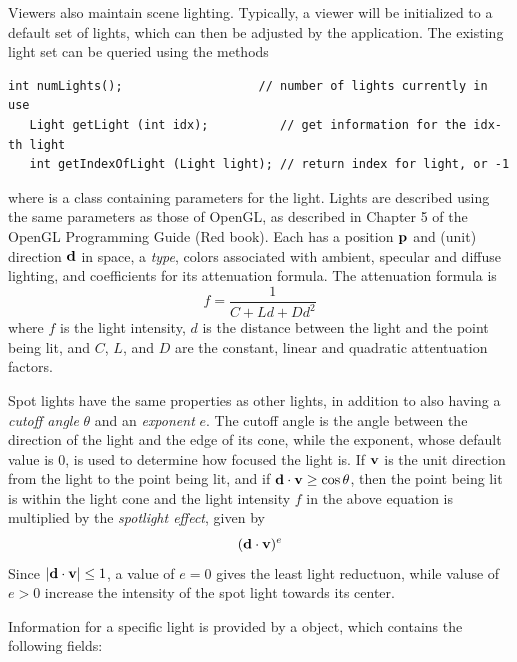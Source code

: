 Viewers also maintain scene lighting. Typically, a viewer will be
initialized to a default set of lights, which can then be
adjusted by the application. The existing
light set can be queried using the methods
%
\begin{lstlisting}[]
   int numLights();                   // number of lights currently in use
   Light getLight (int idx);          // get information for the idx-th light 
   int getIndexOfLight (Light light); // return index for light, or -1
\end{lstlisting}
%
where  is a class 
containing parameters for the light.
Lights are described using the same parameters as those of OpenGL,
as described in Chapter 5 of the OpenGL Programming Guide (Red book).
Each has a position ${\bf p}$ and (unit) direction $\bf d$ in space, a {\it
type}, colors associated with ambient, specular and diffuse lighting,
and coefficients for its attenuation formula. The attenuation formula
is
%
\begin{equation*}
f = \frac{1}{C + L d + D d^2}
\end{equation*}
%
where $f$ is the light intensity, $d$ is the distance between the
light and the point being lit, and $C$, $L$, and $D$ are the constant,
linear and quadratic attentuation factors. 

Spot lights have the same properties as other lights, in addition to
also having a {\it cutoff angle} $\theta$ and an {\it exponent} $e$.
The cutoff angle is the angle between the direction of the light and
the edge of its cone, while the exponent, whose default value is 0, is
used to determine how focused the light is. If $\bf{v}$ is the unit
direction from the light to the point being lit, and if $ {\bf d}
\cdot {\bf v} \ge \cos \theta $, then the point being lit is within
the light cone and the light intensity $f$ in the above equation is
multiplied by the {\it spotlight effect}, given by
%
\begin{equation*}
({\bf d} \cdot {\bf v})^e
\end{equation*}
%
Since $ |{\bf d} \cdot {\bf v}| \le 1$, a value of $e = 0$ gives
the least light reductuon, while valuse of $e > 0$ increase the
intensity of the spot light towards its center.

Information for a specific light is provided by a
 object, which contains the following
fields:

